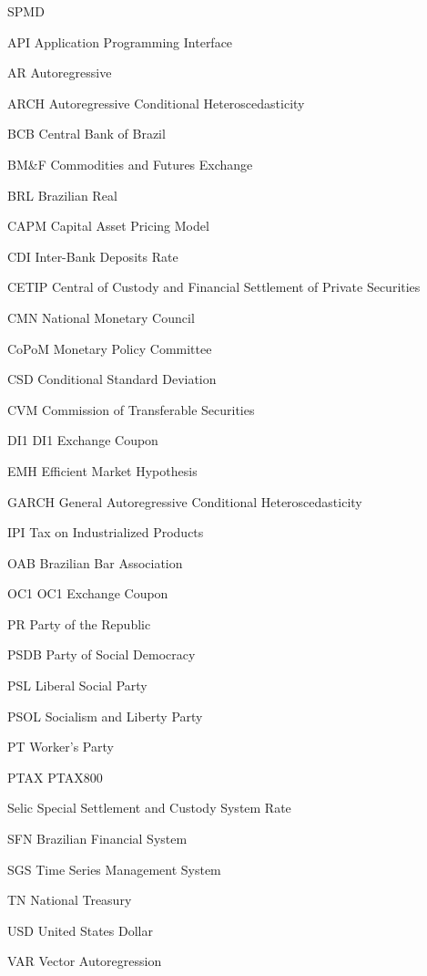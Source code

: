 \documentclass[cic,tc, english]{iiufrgs}
\begin{document}
\listoftables

\begin{listofabbrv}{SPMD}
    
    \item[API] Application Programming Interface
    \item[AR] Autoregressive
    \item[ARCH] Autoregressive Conditional Heteroscedasticity
    \item[BCB] Central Bank of Brazil
    \item[BM\&F] Commodities and Futures Exchange
    \item[BRL] Brazilian Real
    \item[CAPM] Capital Asset Pricing Model
    \item[CDI] Inter-Bank Deposits Rate
    \item[CETIP] Central of Custody and Financial Settlement of Private Securities
    \item[CMN] National Monetary Council
    \item[CoPoM] Monetary Policy Committee
    \item[CSD] Conditional Standard Deviation
    \item[CVM] Commission of Transferable Securities
    \item[DI1] DI1 Exchange Coupon
    \item[EMH] Efficient Market Hypothesis
    \item[GARCH] General Autoregressive Conditional Heteroscedasticity
    \item[IPI] Tax on Industrialized Products
    \item[OAB] Brazilian Bar Association
    \item[OC1] OC1 Exchange Coupon
    \item[PR] Party of the Republic
    \item[PSDB] Party of Social Democracy
    \item[PSL] Liberal Social Party
    \item[PSOL] Socialism and Liberty Party
    \item[PT] Worker's Party
    \item[PTAX] PTAX800
    \item[Selic] Special Settlement and Custody System Rate
    \item[SFN] Brazilian Financial System
    \item[SGS] Time Series Management System
    \item[TN] National Treasury
    \item[USD] United States Dollar
    \item[VAR] Vector Autoregression

\end{listofabbrv}
\end{document}
